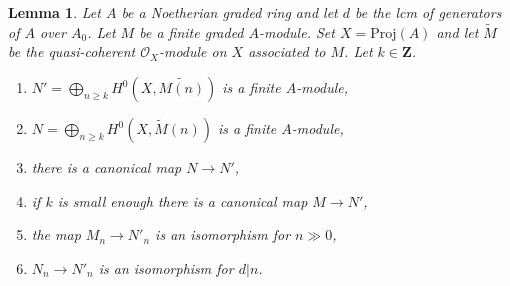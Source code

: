 \documentclass{stacks-project}
\theoremstyle{plain}
\newtheorem{lemma}[subsection]{Lemma}
\theoremstyle{definition}
\theoremstyle{remark}
\numberwithin{equation}{subsection}
\begin{document}
\begin{lemma}
\label{lemma-recover-tail-graded-module-general}
Let $A$ be a Noetherian graded ring and let $d$ be the lcm of generators
of $A$ over $A_0$. Let $M$ be a finite graded $A$-module.
Set $X = \text{Proj}(A)$ and let $\widetilde{M}$ be
the quasi-coherent $\mathcal{O}_X$-module on $X$ associated to $M$.
Let $k \in \mathbf{Z}$.
\begin{enumerate}
\item $N' = \bigoplus_{n \geq k} H^0(X, \widetilde{M(n)})$
is a finite $A$-module,
\item $N = \bigoplus_{n \geq k} H^0(X, \widetilde{M}(n))$
is a finite $A$-module,
\item there is a canonical map $N \to N'$,
\item if $k$ is small enough there is a canonical map $M \to N'$,
\item the map $M_n \to N'_n$ is an isomorphism for $n \gg 0$,
\item $N_n \to N'_n$ is an isomorphism for $d | n$.
\end{enumerate}
\end{lemma}
\end{document}
